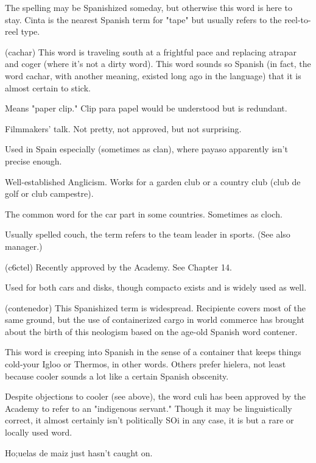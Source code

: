  The spelling may be Spanishized someday, but
otherwise this word is here to stay. Cinta is the nearest Spanish term
for "tape" but usually refers to the reel-to-reel type.

 (cachar) This word is traveling south at a frightful
pace and replacing atrapar and coger (where it's not a dirty word).
This word sounds so Spanish (in fact, the word cachar, with another
meaning, existed long ago in the language) that it is almost certain to
stick.

 Means "paper clip." Clip para papel would be understood but is redundant.

 Filmmakers' talk. Not pretty, not approved, but
not surprising.

 Used in Spain especially (sometimes as clan), where
payaso apparently isn't precise enough.

 Well-established Anglicism. Works for a garden club or
a country club (club de golf or club campestre).

 The common word for the car part in some countries. Sometimes as cloch.

 Usually spelled couch, the term refers to the team
leader in sports. (See also manager.)

 (c6ctel) Recently approved by the Academy. See
Chapter 14.

 Used for both cars and disks, though compacto exists and is widely used as well.

 (contenedor) This Spanishized term is widespread. Recipiente covers most of the same ground, but the use of containerized cargo in world commerce has brought about the birth of this
neologism based on the age-old Spanish word contener.

 This word is creeping into Spanish in the sense of
a container that keeps things cold-your Igloo or Thermos, in other
words. Others prefer hielera, not least because cooler sounds a lot like
a certain Spanish obscenity.

 Despite objections to cooler (see above), the word
culi has been approved by the Academy to refer to an "indigenous servant." Though it may be linguistically correct, it almost certainly isn't
politically SOi in any case, it is but a rare or locally used word.

 Ho;uelas de maiz just hasn't caught on.

